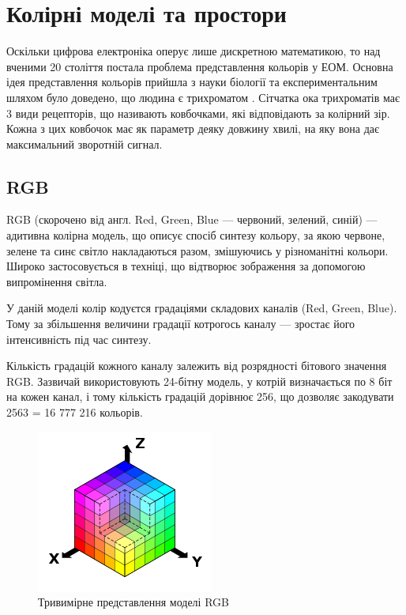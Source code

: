 \section{Колірні моделі та простори}

Оскільки цифрова електроніка оперує лише дискретною математикою, то над вченими 20 століття постала проблема представлення кольорів у ЕОМ. Основна ідея представлення кольорів прийшла з науки біології та експериментальним шляхом було доведено, що людина є трихроматом \cite{ColorSeing}. Сітчатка ока трихроматів має 3 види рецепторів, що називають ковбочками, які відповідають за колірний зір. Кожна з цих ковбочок має як параметр деяку довжину хвилі, на яку вона дає максимальний зворотній сигнал.

\subsection{RGB}
RGB (скорочено від англ. Red, Green, Blue — червоний, зелений, синій) — адитивна колірна модель, що описує спосіб синтезу кольору, за якою червоне, зелене та синє світло накладаються разом, змішуючись у різноманітні кольори. Широко застосовується в техніці, що відтворює зображення за допомогою випромінення світла.

У даній моделі колір кодуєтся градаціями складових каналів (Red, Green, Blue). Тому за збільшення величини градації котрогось каналу — зростає його інтенсивність під час синтезу.

Кількість градацій кожного каналу залежить від розрядності бітового значення RGB. Зазвичай використовують 24-бітну модель, у котрій визначається по 8 біт на кожен канал, і тому кількість градацій дорівнює 256, що дозволяє закодувати 2563 = 16 777 216  кольорів.

\begin{figure}[H]
	\centering
	\includegraphics[width=0.7\linewidth]{theory/img/rgb_representation}
	\caption{Тривимірне представлення моделі RGB}
\end{figure}

